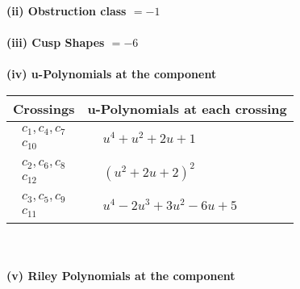 \documentclass[1p]{elsarticle_modified}
\theoremstyle{definition}
\begin{document}
\flushleft \textbf{(ii) Obstruction class $= -1$}\\~\\
\flushleft \textbf{(iii) Cusp Shapes $= -6$}\\~\\
\newpage\renewcommand{\arraystretch}{1}
\flushleft \textbf{(iv) u-Polynomials at the component}\newline \\
\begin{tabular}{m{50pt}|m{274pt}}
Crossings & \hspace{64pt}u-Polynomials at each crossing \\
\hline $$\begin{aligned}c_{1},c_{4},c_{7}\\c_{10}\end{aligned}$$&$\begin{aligned}
&u^4+u^2+2 u+1
\end{aligned}$\\
\hline $$\begin{aligned}c_{2},c_{6},c_{8}\\c_{12}\end{aligned}$$&$\begin{aligned}
&(u^2+2 u+2)^2
\end{aligned}$\\
\hline $$\begin{aligned}c_{3},c_{5},c_{9}\\c_{11}\end{aligned}$$&$\begin{aligned}
&u^4-2 u^3+3 u^2-6 u+5
\end{aligned}$\\
\hline
\end{tabular}\\~\\
\newpage\renewcommand{\arraystretch}{1}
\flushleft \textbf{(v) Riley Polynomials at the component}\newline \\
\end{document}
